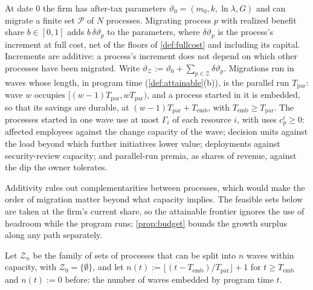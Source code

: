 \begin{assumption}\label{ass:program}
At date 0 the firm has after-tax parameters $\vartheta_0=(m_0,k,\ln\lambda,G)$ and can migrate a finite set $\mathcal P$ of $N$ processes. Migrating process $p$ with realized benefit share $b\in[0,1]$ adds $b\,\delta\vartheta_p$ to the parameters, where $\delta\vartheta_p$ is the process's increment at full cost, net of the floors of \autoref{def:fullcost} and including its capital. Increments are additive: a process's increment does not depend on which other processes have been migrated. Write $\vartheta_{\mathcal Z}:=\vartheta_0+\sum_{p\in\mathcal Z}\delta\vartheta_p$. Migrations run in waves whose length, in program time (\autoref{def:attainable}(b)), is the parallel run $T_{\mathrm{par}}$: wave $w$ occupies $[(w-1)T_{\mathrm{par}},wT_{\mathrm{par}})$, and a process started in it is embedded, so that its savings are durable, at $(w-1)T_{\mathrm{par}}+T_{\mathrm{emb}}$, with $T_{\mathrm{emb}}\ge T_{\mathrm{par}}$. The processes started in one wave use at most $\Gamma_i$ of each resource $i$, with uses $c^i_p\ge0$: affected employees against the change capacity of the wave; decision units against the load beyond which further initiatives lower value; deployments against security-review capacity; and parallel-run premia, as shares of revenue, against the dip the owner tolerates.
\end{assumption}

Additivity rules out complementarities between processes, which would make the order of migration matter beyond what capacity implies. The feasible sets below are taken at the firm's current share, so the attainable frontier ignores the use of headroom while the program runs; \autoref{prop:budget} bounds the growth surplus along any path separately.

Let $\mathcal Z_n$ be the family of sets of processes that can be split into $n$ waves within capacity, with $\mathcal Z_0=\{\emptyset\}$, and let $n(t):=\lfloor(t-T_{\mathrm{emb}})/T_{\mathrm{par}}\rfloor+1$ for $t\ge T_{\mathrm{emb}}$ and $n(t):=0$ before: the number of waves embedded by program time $t$.

